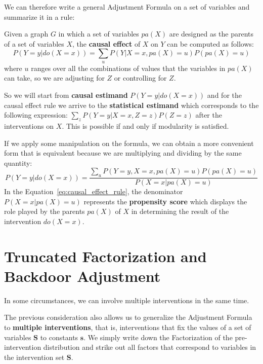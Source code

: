 We can therefore write a general Adjustment Formula on a set of variables and
summarize it in a rule:
\begin{definition}
      Given a graph $G$ in which a set of variables $pa(X)$ are designed as the
      parents of a set of variables $X$, the \textbf{causal effect} of $X$ on
      $Y$ can be computed as follows:
      \begin{equation}
            P(Y = y| do(X = x)) = \sum_{u} P(Y | X = x, pa(X) = u)P(pa(X) = u)
      \end{equation}
      where $u$ ranges over all the combinations of values that the variables in
      $pa(X)$ can take, so we are adjusting for $Z$ or controlling for $Z$.
\end{definition}

So we will start from \textbf{causal estimand} $P(Y = y | do(X = x))$ and for the
causal effect rule we arrive to the \textbf{statistical estimand} which corresponds
to the following expression: $\sum_z P(Y = y|X = x, Z = z) P(Z = z)$ after
the interventions on $X$. This is possible if and only if modularity is satisfied.

If we apply some manipulation on the formula, we can obtain a more convenient
form that is equivalent because we are multiplying and dividing by the same quantity:
\begin{equation}\label{eq:causal_effect_rule}
      P(Y = y| do(X = x)) = \frac{\sum_{u} P(Y = y, X = x, pa(X) = u)P(pa(X) = u)}{P(X = x | pa(X) = u)}
\end{equation}
In the Equation~\ref{eq:causal_effect_rule}, the denominator $P(X = x | pa(X) = u)$
represents the \textbf{propensity score} which displays the role played by the
parents $pa(X)$ of $X$ in determining the result of the intervention $do(X = x)$.

\section{Truncated Factorization and Backdoor Adjustment}
In some circumstances, we can involve multiple interventions in the same time.

The previous consideration also allows us to generalize the Adjustment Formula to
\textbf{multiple interventions}, that is, interventions that fix the values of a
set of variables $\mathbf{S}$ to constants $\mathbf{s}$. We simply write down the
Factorization of the pre-intervention distribution and strike out all factors that
correspond to variables in the intervention set $\mathbf{S}$.

